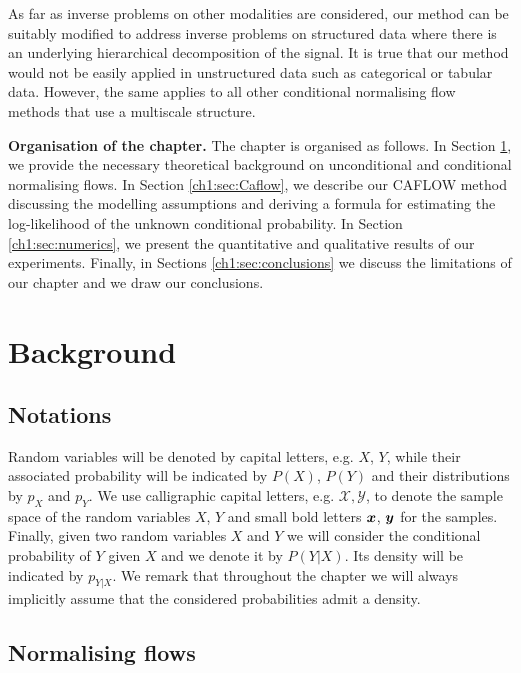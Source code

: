 As far as inverse problems on other modalities are considered, our method can be suitably modified to address inverse problems on structured data where there is an underlying hierarchical decomposition of the signal. It is true that our method would not be easily applied in unstructured data such as categorical or tabular data. However, the same applies to all other conditional normalising flow methods that use a multiscale structure.
\color{black}

\medskip

\textbf{Organisation of the chapter.} The chapter is organised as follows.
In Section \ref{ch1:sec:background}, we provide the necessary theoretical background on unconditional and conditional normalising flows. In Section \ref{ch1:sec:Caflow}, we describe our CAFLOW method discussing the modelling assumptions and deriving a formula for estimating the log-likelihood of the unknown conditional probability. In Section \ref{ch1:sec:numerics}, we present the quantitative and qualitative results of our experiments. Finally, in Sections \ref{ch1:sec:conclusions} we discuss the limitations of our chapter and we draw our conclusions. 

\section{Background}\label{ch1:sec:background}

\subsection{Notations}

Random variables will be denoted by capital letters, e.g. $X$, $Y$, while their associated probability will be indicated by $P(X)$, $P(Y)$ and their distributions by $p_X$ and $p_Y$. 
We use calligraphic capital letters, e.g. $\mathcal{X}, \mathcal{Y}$, to denote the sample space of the random variables $X$, $Y$ and small bold letters $\boldsymbol{x}$, $\boldsymbol{y}$ for the samples. Finally, given two random variables $X$ and $Y$ we will consider the conditional probability of $Y$ given $X$ and we denote it by $P(Y|X)$. Its density will be indicated by $p_{Y|X}$. We remark that throughout the chapter we will always implicitly assume that the considered probabilities admit a density.

\subsection{Normalising flows}\label{ch1:subsec:normalising}

